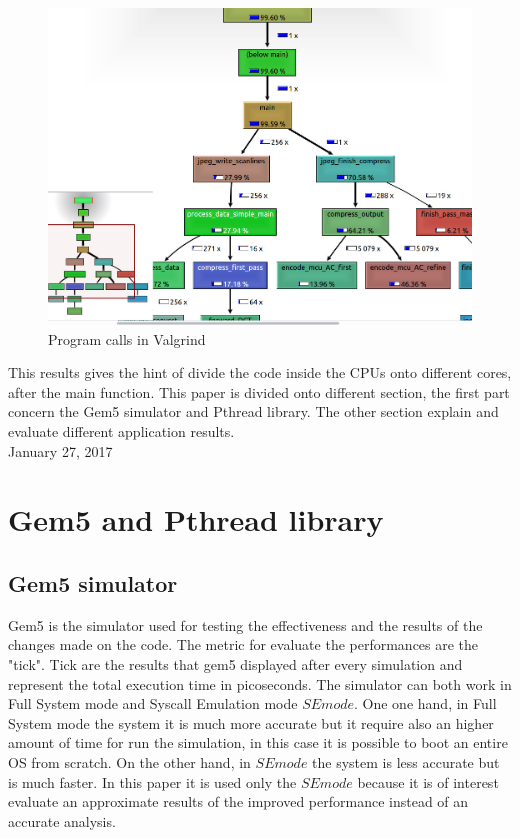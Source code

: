 \documentclass[journal]{IEEEtran}
\begin{document}
\begin{figure}[!h]
	\includegraphics[width=\linewidth]{valgrind}
	\caption{Program calls in Valgrind}
	\label{fig:valgrind}
\end{figure}

This results gives the hint of divide the code inside the CPUs onto different cores, after the main function. This paper is divided onto different section, the first part concern the Gem5 simulator and Pthread library. The other section explain and evaluate different application results.\\
 
\hfill January 27, 2017


\section{Gem5 and Pthread library}
\subsection{Gem5 simulator}
Gem5 is the simulator used for testing the effectiveness and the results of the changes made on the code. The metric for evaluate the performances are the "tick". Tick are the results that gem5 displayed after every simulation and represent the total execution time in picoseconds. 
The simulator can both work in Full System mode and Syscall Emulation mode \(SE mode\). One one hand, in Full System mode the system it is much more accurate but it require also an higher amount of time for run the simulation, in this case it is possible to boot an entire OS from scratch. On the other hand, in \(SE mode\) the system is less accurate but is much faster.
In this paper it is used only the \(SE mode\) because it is of interest evaluate an approximate results of the improved performance instead of an accurate analysis.
\end{document}
